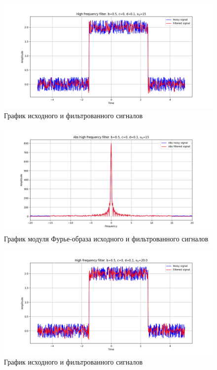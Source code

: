 \documentclass[a4paper, 12pt]{article}
\begin{document}
    \begin{figure}[!htb]
        \centering
        \includegraphics[scale=0.485]{7_u_flt_u_nohigh.png}
        \captionsetup{skip=0pt}
        \caption{График исходного и фильтрованного сигналов}
        \label{fig:fig19}
    \end{figure}
    \begin{figure}[!htb]
        \centering
        \includegraphics[scale=0.485]{7_abs_u_U_nohigh.png}
        \captionsetup{skip=0pt}
        \caption{График модуля Фурье-образа исходного и фильтрованного сигналов}
        \label{fig:fig20}
    \end{figure}
    \begin{figure}[!htb]
        \centering
        \includegraphics[scale=0.485]{6_u_flt_u_nohigh.png}
        \captionsetup{skip=0pt}
        \caption{График исходного и фильтрованного сигналов}
        \label{fig:fig21}
    \end{figure}
\end{document}
